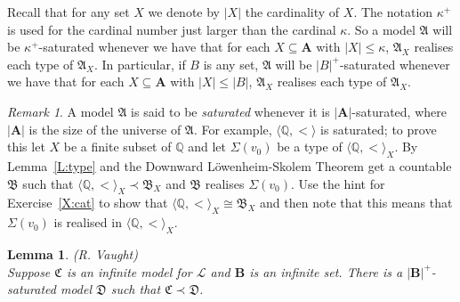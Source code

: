 \documentclass[titlepage, oneside]{amsbook}
\theoremstyle{plain}
\newtheorem{lemma}{Lemma}
\theoremstyle{definition}
\theoremstyle{remark}
\newtheorem*{rem}{Remark}
\newcommand{\lan}{\ensuremath{\mathcal{L}}}
\newcommand{\seq}{\ensuremath{\subseteq}}
\newcommand{\ma}{\ensuremath{\mathfrak{A}}}
\newcommand{\mb}{\ensuremath{\mathfrak{B}}}
\newcommand{\mc}{\ensuremath{\mathfrak{C}}}
\newcommand{\md}{\ensuremath{\mathfrak{D}}}
\newcommand{\ba}{\ensuremath{\mathbf{A}}}
\newcommand{\bb}{\ensuremath{\mathbf{B}}}
\newcommand{\rat}{\ensuremath{\mathbb{Q}}}
\begin{document}
Recall that for any set $X$ we denote by $|X|$ the cardinality of $X$. 
The notation $\kappa^+$ is used for the cardinal number just larger than 
the cardinal $\kappa$.  So a model $\ma$ will be $\kappa^+$-saturated whenever
we have that for each $X \seq \ba$ with $|X| \leq \kappa$, $\ma_X$
realises each type of $\ma_X$.  In particular, if $B$ is any set, 
$\ma$ will be $|B|^+$-saturated whenever we have that for each 
$X \seq \ba$ with $|X| \leq |B|$, $\ma_X$ realises each type of $\ma_X$.



\begin{rem}  A model $\ma$ is said to be \emph{saturated} whenever it is
$| \ba |$-saturated, where $| \ba |$ is the size of the universe of $\ma$.
For example, $\langle \mathbb{Q} , \pmb{<} \rangle$ is saturated; to
prove
this let $X$ be a finite subset of $\rat$ and let $\Sigma (v_0)$ be a
type of $\langle \rat , \pmb{<} \rangle_X$.  By Lemma~\ref{L:type}
and the Downward L\"{o}wenheim-Skolem Theorem get a countable $\mb$ such
that $\langle \rat , \pmb{<} \rangle_X \prec \mb_X$ and $\mb$ realises
$\Sigma (v_0)$.  Use the hint for Exercise~\ref{X:cat} to show
that $\langle \rat , \pmb < \rangle_X \cong \mb_X$ and then note that
this means that $\Sigma (v_0)$ is realised in $\langle \rat , \pmb <
\rangle_X$.
\end{rem}

\begin{lemma}\label{L:vaught}  (R. Vaught)\\
Suppose $\mc$ is an infinite model for $\lan$ and $\bb$ is an infinite
set. There is a $|\bb|^+$-saturated model $\md$ such that $\mc \prec \md$.
\end{lemma}
\end{document}
